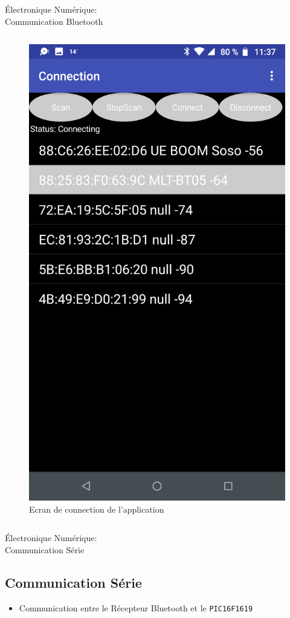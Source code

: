 \documentclass{beamer}
\begin{document}
\begin{frame}{Électronique Numérique:\\Communication Bluetooth}
\begin{columns}[T]
\begin{column}{0.5\textwidth}
\begin{figure}
	    			\hspace*{2em}\includegraphics[height=0.8\textheight]{"../Illus/AppConnection.png"}
	    			\caption{Ecran de connection de l'application}
	    		\end{figure}
	  		\end{column}
		\end{columns}
		
	\end{frame}
	\begin{frame}{Électronique Numérique:\\Communication Série}
		\subsection[Série]{Communication Série}
		\begin{itemize}
		    \item Communication entre le Récepteur Bluetooth et le \texttt{PIC16F1619}
		\end{itemize}
	\end{frame}
\end{document}
